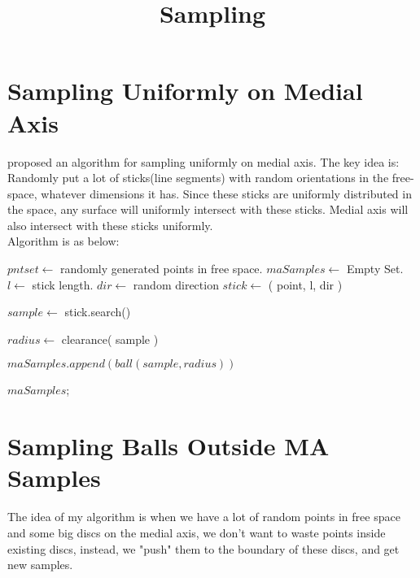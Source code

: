 \documentclass[12pt]{article}
\title{Sampling}
\date{}
\begin{document}
  \maketitle
  
  \section{Sampling Uniformly on Medial Axis}
  \cite{jory} proposed an algorithm for sampling uniformly on medial axis. The key idea is: Randomly put a lot of sticks(line segments) with random orientations in the free-space, whatever dimensions it has. Since these sticks are uniformly distributed in the space, any surface will uniformly intersect with these sticks. Medial axis will also intersect with these sticks uniformly.\\
  
  Algorithm is as below:\\
  
  \begin{algorithmic}[1]
    \State $pntset \gets$ randomly generated points in free space.
    \State $maSamples \gets$ Empty Set.
    \State $l \gets $ stick length.	 
		\State $dir \gets$ random direction  
		\State $stick \gets$ ( point, l, dir ) 
		
			\indent\indent $sample \gets$ stick.search()
			
			\indent\indent $radius \gets$ clearance( sample ) 
			
			\indent\indent $maSamples.append( ball(sample, radius) )$
		\EndIf
	\EndFor
	
	\Return $maSamples$;
  \EndFunction
  \end{algorithmic}
 
  \section{Sampling Balls Outside MA Samples }
  
  The idea of my algorithm is when we have a lot of random points in free space and some big discs on the medial axis, we don't want to waste points inside existing discs, instead, we "push" them to the boundary of these discs, and get new samples.
  
\end{document}
